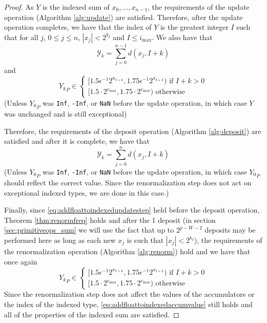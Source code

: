   \begin{proof}
    As $Y$ is the indexed sum of $x_0, ..., x_{n - 1}$, the requirements of the update operation (Algorithm \ref{alg:update}) are satisfied. Therefore, after the update operation completes, we have that the index of $Y$ is the greatest integer $I$ such that for all $j$, $0 \leq j \leq n$, $|x_j| < 2^{b_I}$ and $I \leq i_{\max}$. We also have that 
\[
\mathcal{Y}_k = \sum\limits_{j = 0}^{n - 1} d(x_j, I + k)
\]
  and
  \begin{equation}
          {Y_k}_P \in \begin{cases}[1.5  \epsilon^{-1} 2^{a_{I + k}}, 1.75  \epsilon^{-1} 2^{a_{I + k}}) \text{ if } I + k > 0 \\ [1.5 \cdot 2^{e_{\max}}, 1.75 \cdot 2^{e_{\max}})\text{ otherwise}\end{cases} \label{eq:addfloattoindexedupdatestep}
  \end{equation}
  (Unless ${Y_0}_P$ was \texttt{Inf}, \texttt{-Inf}, or \texttt{NaN} before the update operation, in which case $Y$ was unchanged and is still exceptional)

  Therefore, the requirements of the deposit operation (Algorithm \ref{alg:deposit}) are satisfied and after it is complete, we have that
  \begin{equation}
    \mathcal{Y}_k = \sum\limits_{j = 0}^{n} d(x_j, I + k)
    \label{eq:addfloattoindexedaccumvalue}
  \end{equation}
  (Unless ${Y_0}_P$ was \texttt{Inf}, \texttt{-Inf}, or \texttt{NaN} before the update operation, in which case ${Y_0}_P$ should reflect the correct value. Since the renormalization step does not act on exceptional indexed types, we are done in this case.)

  Finally, since \eqref{eq:addfloattoindexedupdatestep} held before the deposit operation, Theorem \ref{thm:renormfreq} holds and after the 1 deposit (in section \ref{sec:primitiveops_sum} we will use the fact that up to $2^{p - W - 2}$ deposits may be performed here as long as each new $x_j$ is such that $|x_j| < 2^{b_I}$), the requirements of the renormalization operation (Algorithm \ref{alg:renorm}) hold and we have that once again
  \[
  {Y_k}_P \in \begin{cases}[1.5  \epsilon^{-1} 2^{a_{I + k}}, 1.75  \epsilon^{-1} 2^{a_{I + k}}) \text{ if } I + k > 0 \\ [1.5 \cdot 2^{e_{\max}}, 1.75 \cdot 2^{e_{\max}})\text{ otherwise}\end{cases}
  \]
  Since the renormalization step does not affect the values of the accumulators or the index of the indexed type, \eqref{eq:addfloattoindexedaccumvalue} still holds and all of the properties of the indexed sum are satisfied.
  \end{proof}

